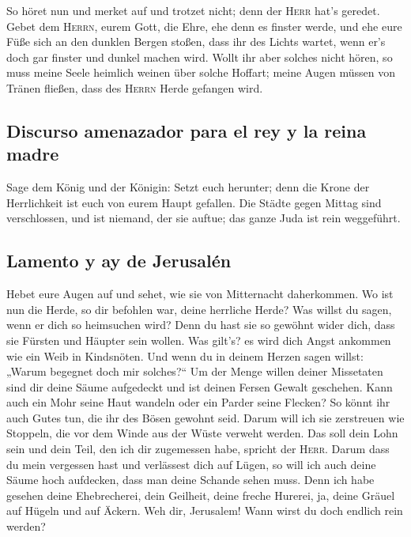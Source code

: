  So höret nun und merket auf und trotzet nicht; denn der
\textsc{Herr} hat's geredet.  Gebet dem \textsc{Herrn},
eurem Gott, die Ehre, ehe denn es finster werde, und ehe eure Füße sich
an den dunklen Bergen stoßen, dass ihr des Lichts wartet, wenn er's doch
gar finster und dunkel machen wird.  Wollt ihr aber
solches nicht hören, so muss meine Seele heimlich weinen über solche
Hoffart; meine Augen müssen von Tränen fließen, dass des \textsc{Herrn}
Herde gefangen wird.

\hypertarget{discurso-amenazador-para-el-rey-y-la-reina-madre}{%
\subsection{Discurso amenazador para el rey y la reina
madre}\label{discurso-amenazador-para-el-rey-y-la-reina-madre}}

 Sage dem König und der Königin: Setzt euch herunter;
denn die Krone der Herrlichkeit ist euch von eurem Haupt gefallen.
 Die Städte gegen Mittag sind verschlossen, und ist
niemand, der sie auftue; das ganze Juda ist rein weggeführt.

\hypertarget{lamento-y-ay-de-jerusaluxe9n}{%
\subsection{Lamento y ay de
Jerusalén}\label{lamento-y-ay-de-jerusaluxe9n}}

 Hebet eure Augen auf und sehet, wie sie von Mitternacht
daherkommen. Wo ist nun die Herde, so dir befohlen war, deine herrliche
Herde?  Was willst du sagen, wenn er dich so heimsuchen
wird? Denn du hast sie so gewöhnt wider dich, dass sie Fürsten und
Häupter sein wollen. Was gilt's? es wird dich Angst ankommen wie ein
Weib in Kindsnöten.  Und wenn du in deinem Herzen sagen
willst: „Warum begegnet doch mir solches?{}`` Um der Menge willen deiner
Missetaten sind dir deine Säume aufgedeckt und ist deinen Fersen Gewalt
geschehen.  Kann auch ein Mohr seine Haut wandeln oder
ein Parder seine Flecken? So könnt ihr auch Gutes tun, die ihr des Bösen
gewohnt seid.  Darum will ich sie zerstreuen wie
Stoppeln, die vor dem Winde aus der Wüste verweht werden.
 Das soll dein Lohn sein und dein Teil, den ich dir
zugemessen habe, spricht der \textsc{Herr}. Darum dass du mein vergessen
hast und verlässest dich auf Lügen,  so will ich auch
deine Säume hoch aufdecken, dass man deine Schande sehen muss.
 Denn ich habe gesehen deine Ehebrecherei, dein Geilheit,
deine freche Hurerei, ja, deine Gräuel auf Hügeln und auf Äckern. Weh
dir, Jerusalem! Wann wirst du doch endlich rein werden?

